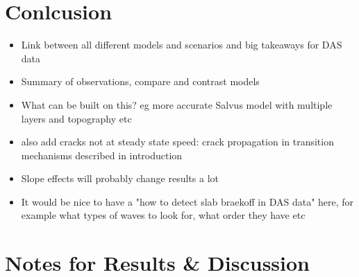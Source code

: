\documentclass[10pt]{article}
\begin{document}
\section{Conlcusion}
\begin{itemize}
  \item Link between all different models and scenarios and big takeaways for DAS data
  \item Summary of observations, compare and contrast models
  \item What can be built on this? eg more accurate Salvus model with multiple layers and topography etc
  \item also add cracks not at steady state speed: crack propagation in transition mechanisms described in introduction 
  \item Slope effects will probably change results a lot
  \item It would be nice to have a "how to detect slab braekoff in DAS data" here, for example what types of waves to look for, what order they have etc
\end{itemize}

\section{Notes for Results \& Discussion}
\end{document}
